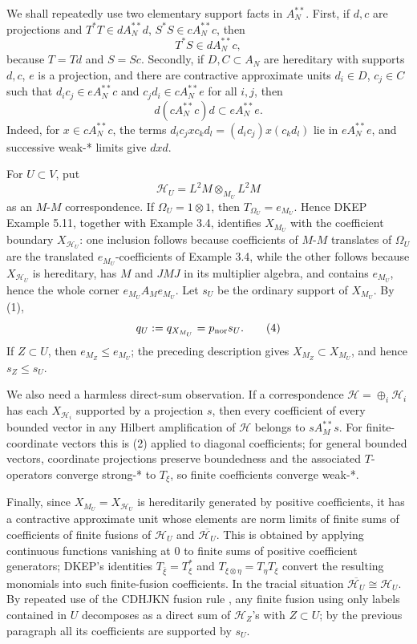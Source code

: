 \documentclass[12pt]{article}
\newcommand{\cH}{\mathcal H}
\begin{document}
We shall repeatedly use two elementary support facts in \(A_N^{**}\).  First,
if \(d,c\) are projections and \(T^*T\in dA_N^{**}d\),
\(S^*S\in cA_N^{**}c\), then
\[
        T^*S\in dA_N^{**}c,                                      \tag{2}
\]
because \(T=Td\) and \(S=Sc\).  Secondly, if \(D,C\subset A_N\) are hereditary
with supports \(d,c\), \(e\) is a projection, and there are contractive
approximate units \(d_i\in D\), \(c_j\in C\) such that
\(d_ic_j\in eA_N^{**}c\) and \(c_jd_i\in cA_N^{**}e\) for all \(i,j\), then
\[
        d(cA_N^{**}c)d\subset eA_N^{**}e.                         \tag{3}
\]
Indeed, for \(x\in cA_N^{**}c\), the terms
\(d_ic_jxc_kd_l=(d_ic_j)x(c_kd_l)\) lie in \(eA_N^{**}e\), and successive
weak-* limits give \(dxd\).

For \(U\subset V\), put
\[
        \cH_U=L^2M\otimes_{M_U}L^2M
\]
as an \(M\)-\(M\) correspondence.  If \(\Omega_U=1\otimes1\), then
\(T_{\Omega_U}=e_{M_U}\).  Hence DKEP Example 5.11, together with Example 3.4,
identifies \(X_{M_U}\) with the coefficient boundary \(X_{\cH_U}\): one
inclusion follows because coefficients of \(M\)-\(M\) translates of
\(\Omega_U\) are the translated \(e_{M_U}\)-coefficients of Example 3.4, while
the other follows because \(X_{\cH_U}\) is hereditary, has \(M\) and \(JMJ\) in
its multiplier algebra, and contains \(e_{M_U}\), hence the whole corner
\(e_{M_U}A_Me_{M_U}\).  Let \(s_U\) be the ordinary support of \(X_{M_U}\).  By
(1),
\[
        q_U:=q_{X_{M_U}}=p_{\rm nor}s_U .                       \tag{4}
\]
If \(Z\subset U\), then \(e_{M_Z}\le e_{M_U}\); the preceding description gives
\(X_{M_Z}\subset X_{M_U}\), and hence \(s_Z\le s_U\).

We also need a harmless direct-sum observation.  If a correspondence
\(\cH=\oplus_i\cH_i\) has each \(X_{\cH_i}\) supported by a projection \(s\),
then every coefficient of every bounded vector in any Hilbert amplification of
\(\cH\) belongs to \(sA_M^{**}s\).  For finite-coordinate vectors this is (2)
applied to diagonal coefficients; for general bounded vectors, coordinate
projections preserve boundedness and the associated \(T\)-operators converge
strong-* to \(T_\xi\), so finite coefficients converge weak-*.

Finally, since \(X_{M_U}=X_{\cH_U}\) is hereditarily generated by positive
coefficients, it has a contractive approximate unit whose elements are norm
limits of finite sums of coefficients of finite fusions of \(\cH_U\) and
\(\overline{\cH_U}\).  This is obtained by applying continuous functions
vanishing at \(0\) to finite sums of positive coefficient generators; DKEP's
identities \(T_{\bar\xi}=T_\xi^*\) and \(T_{\xi\otimes\eta}=T_\eta T_\xi\)
convert the resulting monomials into such finite-fusion coefficients.  In the
tracial situation \(\overline{\cH_U}\cong\cH_U\).  By repeated use of the
CDHJKN fusion rule \cite[Theorem 5.4 and Proposition 5.5]{CDHJKN}, any finite
fusion using only labels contained in \(U\) decomposes as a direct sum of
\(\cH_Z\)'s with \(Z\subset U\); by the previous paragraph all its coefficients
are supported by \(s_U\).
\end{document}
